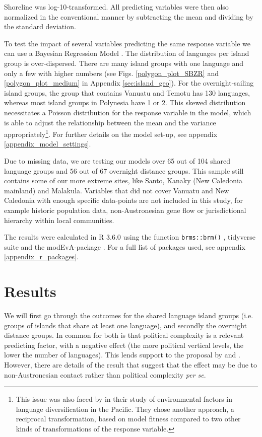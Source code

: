 \documentclass[unnumsec,webpdf,modern,medium]{oup-authoring-template}
\begin{document}
Shoreline was log-10-transformed. All predicting variables were then also normalized in the conventional manner by subtracting the mean and dividing by the standard deviation.

To test the impact of several variables predicting the same response variable we can use a Bayesian Regression Model \citep{gelman2006data, burkner2017brms}. The distribution of languages per island group is over-dispersed. There are many island groups with one language and only a few with higher numbers (see Figs. \ref{polygon_plot_SBZR} and \ref{polygon_plot_medium} in Appendix \ref{sec:island_geo}). For the overnight-sailing island groups, the group that contains Vanuatu and Temotu has 130 languages, whereas most island groups in Polynesia have 1 or 2. This skewed distribution necessitates a Poisson distribution for the response variable in the model, which is able to adjust the relationship between the mean and the variance appropriately\footnote{This issue was also faced by \citet{gavin2012island} in their study of environmental factors in language diversification in the Pacific. They chose another approach, a reciprocal transformation, based on model fitness compared to two other kinds of transformations of the response variable.}. For further details on the model set-up, see appendix \ref{appendix_model_settings}.

Due to missing data, we are testing our models over 65 out of 104 shared language groups and 56 out of 67 overnight distance groups. This sample still contains some of our more extreme sites, like Santo, Kanaky (New Caledonia mainland) and Malakula. Variables that did not cover Vanuatu and New Caledonia with enough specific data-points are not included in this study, for example historic population data, non-Austronesian gene flow or jurisdictional hierarchy within local communities. 

The results were calculated in R 3.6.0 \citep{R} using the function \texttt{brms::brm()} \citep{burkner2017brms}, tidyverse suite \citep{tidyverse13} and the modEvA-package \citep{barbosa2016package}. For a full list of packages used, see appendix \ref{appendix_r_packages}.

\FloatBarrier
\section{Results}
We will first go through the outcomes for the shared language island groups (i.e. groups of islands that share at least one language), and secondly the overnight distance groups. In common for both is that political complexity is a relevant predicting factor, with a negative effect (the more political vertical levels, the lower the number of languages). This lends support to the proposal by \citet{pawley81} and \citet{pawley2007}. However, there are details of the result that suggest that the effect may be due to non-Austronesian contact rather than political complexity \emph{per se}.
\end{document}
